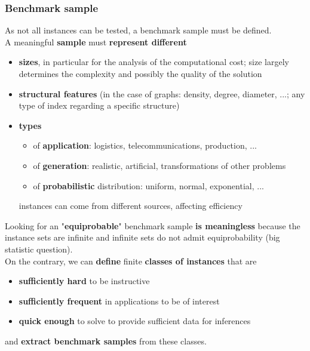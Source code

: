 \newpage

\subsubsection{Benchmark sample}
As not all instances can be tested, a benchmark sample must be defined.\\

A meaningful \textbf{sample} must \textbf{represent different}
\begin{itemize}
	\item \textbf{sizes}, in particular for the analysis of the computational cost; size largely determines the complexity and possibly the quality of the solution
	\item \textbf{structural features} (in the case of graphs: density, degree, diameter, ...; any type of index regarding a specific structure)
	\item \textbf{types}
	\begin{itemize}
		\item of \textbf{application}: logistics, telecommunications, production, ...
		\item of \textbf{generation}: realistic, artificial, transformations of other problems
		\item of \textbf{probabilistic} distribution: uniform, normal, exponential, ...
	\end{itemize}
	instances can come from different sources, affecting efficiency
\end{itemize}

Looking for an "\textbf{equiprobable}" benchmark sample \textbf{is meaningless} because the instance sets are infinite and infinite sets do not admit equiprobability (big statistic question).\\

On the contrary, we can \textbf{define} finite \textbf{classes of instances} that are
\begin{itemize}
	\item \textbf{sufficiently hard} to be instructive
	\item \textbf{sufficiently frequent} in applications to be of interest
	\item \textbf{quick enough} to solve to provide sufficient data for inferences
\end{itemize}
and \textbf{extract benchmark samples} from these classes.

\newpage

